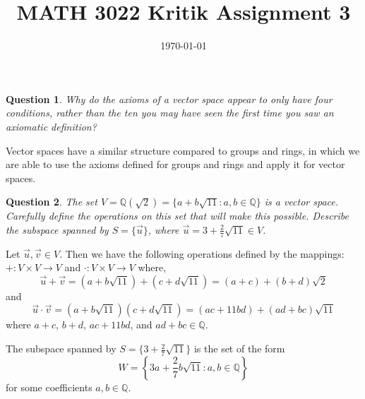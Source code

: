 \documentclass[11pt]{amsart}
\title{MATH 3022 Kritik Assignment 3}
\date{\today}
\newtheorem{question}{Question}
\begin{document}
\maketitle

\begin{question}
    Why do the axioms of a vector space appear to only have four conditions, rather than the ten you may have seen the first time you saw an axiomatic definition?
\end{question}

Vector spaces have a similar structure compared to groups and rings, in which we are able to use the axioms defined for groups and rings and apply it for vector spaces.

\begin{question}
    The set $V = \mathbb{Q}(\sqrt{2}) = \{a + b\sqrt{11} : a, b \in \mathbb{Q}\}$ is a vector space. Carefully define the operations on this set that will make this possible. Describe the subspace spanned by $S = \{\vec{u}\}$, where $\vec{u} = 3 + \frac{2}{7}\sqrt{11} \in V$.
\end{question}

Let $\vec{u}, \vec{v} \in V$. Then we have the following operations defined by the mappings: $+ : V \times V \to V$ and $\cdot : V \times V \to V$ where,
\begin{equation*}
    \vec{u} + \vec{v} = (a + b\sqrt{11}) + (c + d\sqrt{11}) = (a + c) + (b + d)\sqrt{2}
\end{equation*}
and
\begin{equation*}
    \vec{u} \cdot \vec{v} = (a + b\sqrt{11})(c + d\sqrt{11}) = (ac + 11bd) + (ad + bc)\sqrt{11}
\end{equation*}
where $a + c$, $b + d$, $ac + 11bd$, and $ad + bc \in \mathbb{Q}$.

The subspace spanned by $S = \{3 + \frac{2}{7}\sqrt{11}\}$ is the set of the form
\begin{equation*}
    W = \left\{3a + \frac{2}{7}b\sqrt{11} : a, b \in \mathbb{Q}\right\}
\end{equation*}
for some coefficients $a, b \in \mathbb{Q}$.
\end{document}
